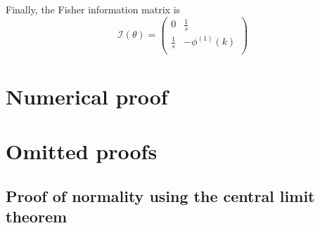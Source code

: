 \documentclass[final]{aomart}
\newtheorem[{}\it]{thm}{Theorem}[section]
\theoremstyle{definition}
\newtheorem*[{}\it]{notation}{Notation}
\numberwithin{equation}{section}
\newcommand{\fisher}{\mathcal{I}} %
\begin{document}
Finally, the Fisher information matrix is 
\[ \fisher(\theta) = \left( \begin{array}{cc}
	0 & \frac{1}{s} \\
	\frac{1}{s} & -\phi^{(1)}(k) \\
	 \end{array} \right)\] 
\section{Numerical proof}

\appendix
\section{Omitted proofs}
\subsection{Proof of normality using the central limit theorem}
\label{app:banproof}
\end{document}

